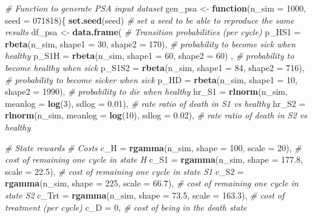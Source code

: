 \documentclass[]{article}
\newenvironment{Shaded}{\begin{snugshade}}{\end{snugshade}}
\newcommand{\KeywordTok}[1]{\textcolor[rgb]{0.13,0.29,0.53}{\textbf{#1}}}
\newcommand{\DataTypeTok}[1]{\textcolor[rgb]{0.13,0.29,0.53}{#1}}
\newcommand{\DecValTok}[1]{\textcolor[rgb]{0.00,0.00,0.81}{#1}}
\newcommand{\FloatTok}[1]{\textcolor[rgb]{0.00,0.00,0.81}{#1}}
\newcommand{\StringTok}[1]{\textcolor[rgb]{0.31,0.60,0.02}{#1}}
\newcommand{\CommentTok}[1]{\textcolor[rgb]{0.56,0.35,0.01}{\textit{#1}}}
\newcommand{\ControlFlowTok}[1]{\textcolor[rgb]{0.13,0.29,0.53}{\textbf{#1}}}
\newcommand{\NormalTok}[1]{#1}
\begin{document}
\begin{Shaded}
\begin{Highlighting}[]
\CommentTok{# Function to generate PSA input dataset}
\NormalTok{gen_psa <-}\StringTok{ }\ControlFlowTok{function}\NormalTok{(}\DataTypeTok{n_sim =} \DecValTok{1000}\NormalTok{, }\DataTypeTok{seed =} \DecValTok{071818}\NormalTok{)\{}
  \KeywordTok{set.seed}\NormalTok{(seed) }\CommentTok{# set a seed to be able to reproduce the same results}
\NormalTok{  df_psa <-}\StringTok{ }\KeywordTok{data.frame}\NormalTok{(}
    \CommentTok{# Transition probabilities (per cycle)}
    \DataTypeTok{p_HS1   =} \KeywordTok{rbeta}\NormalTok{(n_sim, }\DataTypeTok{shape1 =} \DecValTok{30}\NormalTok{, }\DataTypeTok{shape2 =} \DecValTok{170}\NormalTok{),     }\CommentTok{# probability to become sick when healthy}
    \DataTypeTok{p_S1H   =} \KeywordTok{rbeta}\NormalTok{(n_sim, }\DataTypeTok{shape1 =} \DecValTok{60}\NormalTok{, }\DataTypeTok{shape2 =} \DecValTok{60}\NormalTok{) ,     }\CommentTok{# probability to become healthy when sick}
    \DataTypeTok{p_S1S2  =} \KeywordTok{rbeta}\NormalTok{(n_sim, }\DataTypeTok{shape1 =} \DecValTok{84}\NormalTok{, }\DataTypeTok{shape2 =} \DecValTok{716}\NormalTok{),     }\CommentTok{# probability to become sicker when sick}
    \DataTypeTok{p_HD    =} \KeywordTok{rbeta}\NormalTok{(n_sim, }\DataTypeTok{shape1 =} \DecValTok{10}\NormalTok{, }\DataTypeTok{shape2 =} \DecValTok{1990}\NormalTok{),    }\CommentTok{# probability to die when healthy}
    \DataTypeTok{hr_S1   =} \KeywordTok{rlnorm}\NormalTok{(n_sim, }\DataTypeTok{meanlog =} \KeywordTok{log}\NormalTok{(}\DecValTok{3}\NormalTok{),  }\DataTypeTok{sdlog =} \FloatTok{0.01}\NormalTok{),  }\CommentTok{# rate ratio of death in S1 vs healthy}
    \DataTypeTok{hr_S2   =} \KeywordTok{rlnorm}\NormalTok{(n_sim, }\DataTypeTok{meanlog =} \KeywordTok{log}\NormalTok{(}\DecValTok{10}\NormalTok{), }\DataTypeTok{sdlog =} \FloatTok{0.02}\NormalTok{),  }\CommentTok{# rate ratio of death in S2 vs healthy }
    
    \CommentTok{# State rewards}
    \CommentTok{# Costs}
    \DataTypeTok{c_H   =} \KeywordTok{rgamma}\NormalTok{(n_sim, }\DataTypeTok{shape =} \DecValTok{100}\NormalTok{, }\DataTypeTok{scale =} \DecValTok{20}\NormalTok{),     }\CommentTok{# cost of remaining one cycle in state H}
    \DataTypeTok{c_S1  =} \KeywordTok{rgamma}\NormalTok{(n_sim, }\DataTypeTok{shape =} \FloatTok{177.8}\NormalTok{, }\DataTypeTok{scale =} \FloatTok{22.5}\NormalTok{), }\CommentTok{# cost of remaining one cycle in state S1}
    \DataTypeTok{c_S2  =} \KeywordTok{rgamma}\NormalTok{(n_sim, }\DataTypeTok{shape =} \DecValTok{225}\NormalTok{, }\DataTypeTok{scale =} \FloatTok{66.7}\NormalTok{),   }\CommentTok{# cost of remaining one cycle in state S2}
    \DataTypeTok{c_Trt =} \KeywordTok{rgamma}\NormalTok{(n_sim, }\DataTypeTok{shape =} \FloatTok{73.5}\NormalTok{, }\DataTypeTok{scale =} \FloatTok{163.3}\NormalTok{), }\CommentTok{# cost of treatment (per cycle)}
    \DataTypeTok{c_D   =} \DecValTok{0}\NormalTok{,                                          }\CommentTok{# cost of being in the death state}
    

\end{Highlighting}
\end{Shaded}
\end{document}
